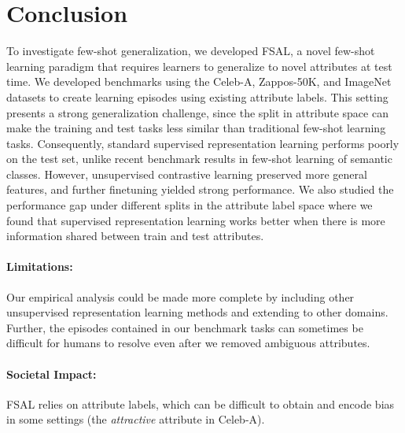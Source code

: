 \savespacebeforesection
\section{Conclusion}
\savespacebeforesection
\savespacebeforeitem
{}

To investigate few-shot generalization, we developed FSAL, a novel few-shot
learning paradigm that requires learners to generalize to novel attributes at
test time. We developed benchmarks using the Celeb-A, Zappos-50K, and ImageNet
datasets to create learning episodes using existing attribute labels. This
setting presents a strong generalization challenge, since the split in
attribute space can make the training and test tasks less similar than
traditional few-shot learning tasks. Consequently, standard supervised
representation learning performs poorly on the test set, unlike recent
benchmark results in few-shot learning of semantic classes. However,
unsupervised contrastive learning preserved more general features, and further
finetuning yielded strong performance. We also studied the performance gap
under different splits in the attribute label space where we found that
supervised representation learning works better when there is more information
shared between train and test attributes.

\paragraph{Limitations:} Our empirical analysis could be made more complete by
including other unsupervised representation learning methods and extending to
other domains. Further, the episodes contained in our benchmark tasks can
sometimes be difficult for humans to resolve even after we removed ambiguous
attributes.

\paragraph{Societal Impact:} FSAL relies on attribute labels, which can be
difficult to obtain and encode bias in some settings (\eg the \emph{attractive}
attribute in Celeb-A).
